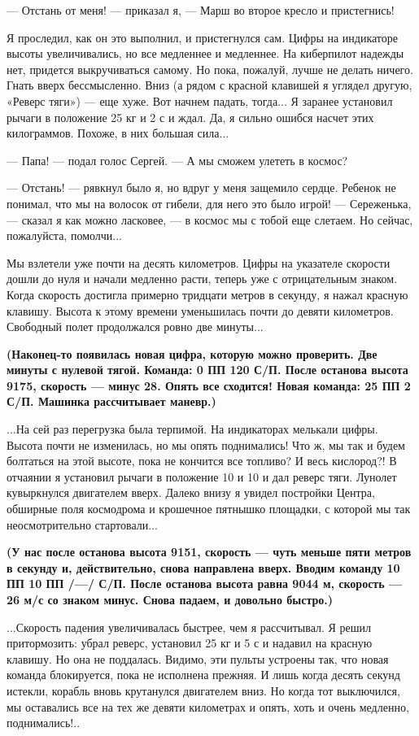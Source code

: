 \documentclass[11pt,a4paper,oneside]{article}
\begin{document}
— Отстань от меня! — приказал я, — Марш во второе кресло и пристегнись!

Я проследил, как он это выполнил, и пристегнулся сам. Цифры на индикаторе высоты увеличивались, но все медленнее и медленнее. На киберпилот надежды нет, придется выкручиваться самому. Но пока, пожалуй, лучше не делать ничего. Гнать вверх бессмысленно. Вниз (а рядом с красной клавишей я углядел другую, «Реверс тяги») — еще хуже. Вот начнем падать, тогда... Я заранее установил рычаги в положение 25 кг и 2 с и ждал. Да, я сильно ошибся насчет этих килограммов. Похоже, в них большая сила...

— Папа! — подал голос Сергей. — А мы сможем улететь в космос?

— Отстань! — рявкнул было я, но вдруг у меня защемило сердце. Ребенок не понимал, что мы на волосок от гибели, для него это было игрой! — Сереженька, — сказал я как можно ласковее, — в космос мы с тобой еще слетаем. Но сейчас, пожалуйста, помолчи...

Мы взлетели уже почти на десять километров. Цифры на указателе скорости дошли до нуля и начали медленно расти, теперь уже с отрицательным знаком. Когда скорость достигла примерно тридцати метров в секунду, я нажал красную клавишу. Высота к этому времени уменьшилась почти до девяти километров. Свободный полет продолжался ровно две минуты...

\textbf{
(Наконец-то появилась новая цифра, которую можно проверить. Две минуты с нулевой тягой. Команда: 0 ПП 120 С/П. После останова высота 9175, скорость — минус 28. Опять все сходится! Новая команда: 25 ПП 2 С/П. Машинка рассчитывает маневр.)}

...На сей раз перегрузка была терпимой. На индикаторах мелькали цифры. Высота почти не изменилась, но мы опять поднимались! Что ж, мы так и будем болтаться на этой высоте, пока не кончится все топливо? И весь кислород?! В отчаянии я установил рычаги в положение 10 и 10 и дал реверс тяги. Лунолет кувыркнулся двигателем вверх. Далеко внизу я увидел постройки Центра, обширные поля космодрома и крошечное пятнышко площадки, с которой мы так неосмотрительно стартовали...

\textbf{
(У нас после останова высота 9151, скорость — чуть меньше пяти метров в секунду и, действительно, снова направлена вверх. Вводим команду 10 ПП 10 ПП /—/ С/П. После останова высота равна 9044 м, скорость — 26 м/с со знаком минус. Снова падаем, и довольно быстро.)}

...Скорость падения увеличивалась быстрее, чем я рассчитывал. Я решил притормозить: убрал реверс, установил 25 кг и 5 с и надавил на красную клавишу. Но она не поддалась. Видимо, эти пульты устроены так, что новая команда блокируется, пока не исполнена прежняя. И лишь когда десять секунд истекли, корабль вновь крутанулся двигателем вниз. Но когда тот выключился, мы оставались все на тех же девяти километрах и опять, хоть и очень медленно, поднимались!..
\end{document}

